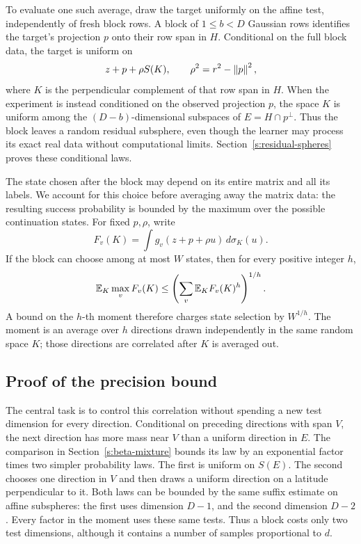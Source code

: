 To evaluate one such average, draw the target uniformly on the affine
test, independently of fresh block rows. A block of \(1\le b<D\)
Gaussian rows identifies the target's projection
\(p\) onto their row span in \(H\). Conditional on the full block
data, the target is uniform on
\[
 z+p+\rho S(K),\qquad \rho^2=r^2-\left\lVert p\right\rVert^2,
\]
where \(K\) is the perpendicular complement of that row span in
\(H\). When the experiment is instead conditioned on the observed
projection \(p\), the space \(K\) is uniform among the
\((D-b)\)-dimensional subspaces of \(E=H\cap p^\perp\).
Thus the block leaves a random residual subsphere, even though the
learner may process its exact real data without computational limits.
Section~\ref{s:residual-spheres} proves these conditional laws.

The state chosen after the block may depend on its entire matrix and
all its labels. We account for this choice before averaging away the
matrix data: the resulting success probability is bounded by the
maximum over the possible continuation states. For fixed \(p,\rho\),
write
\[
 F_v(K)=\int g_v(z+p+\rho u)\,d\sigma_K(u).
\]
If the block can choose among at most \(W\) states, then for every
positive integer \(h\),
\[
 \mathbb E_K\max_v F_v(K)
 \le\left(\sum_v\mathbb E_K F_v(K)^h\right)^{1/h}.
\]
A bound on the \(h\)-th moment therefore charges state selection by
\(W^{1/h}\). The moment is an average over \(h\) directions drawn
independently in the same random space \(K\); those directions are
correlated after \(K\) is averaged out.

\subsection*{Proof of the precision bound}

The central task is to control this correlation without spending a
new test dimension for every direction. Conditional on preceding
directions with span \(V\), the next direction has more mass near
\(V\) than a uniform direction in \(E\). The comparison in
Section~\ref{s:beta-mixture} bounds its law by an exponential factor
times two simpler probability laws. The first is uniform on
\(S(E)\). The second chooses one direction in \(V\) and then draws a
uniform direction on a latitude perpendicular to it. Both laws can
be bounded by the same suffix estimate on affine subspheres: the
first uses dimension \(D-1\), and the second dimension \(D-2\).
Every factor in the moment uses these same tests. Thus a block costs
only two test dimensions, although it contains a number of samples
proportional to \(d\).

